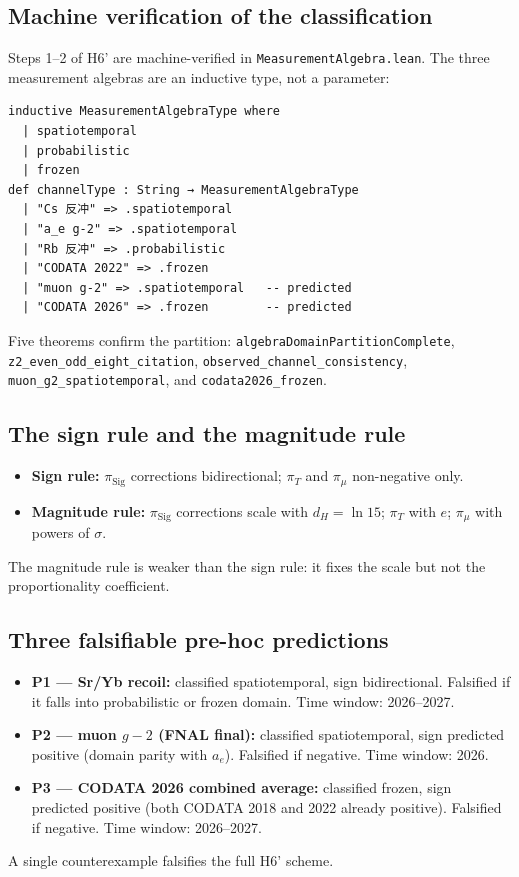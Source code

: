 \documentclass[11pt,twoside]{article}
\begin{document}
\subsection{Machine verification of the classification}
Steps 1--2 of H6' are machine-verified in \texttt{MeasurementAlgebra.lean}. The three measurement algebras are an inductive type, not a parameter:
\begin{lstlisting}[language=Lean]
inductive MeasurementAlgebraType where
  | spatiotemporal
  | probabilistic
  | frozen
def channelType : String → MeasurementAlgebraType
  | "Cs 反冲" => .spatiotemporal
  | "a_e g-2" => .spatiotemporal
  | "Rb 反冲" => .probabilistic
  | "CODATA 2022" => .frozen
  | "muon g-2" => .spatiotemporal   -- predicted
  | "CODATA 2026" => .frozen        -- predicted
\end{lstlisting}
Five theorems confirm the partition: \texttt{algebraDomainPartitionComplete}, \texttt{z2\_even\_odd\_eight\_citation}, \texttt{observed\_channel\_consistency}, \texttt{muon\_g2\_spatiotemporal}, and \texttt{codata2026\_frozen}.

\subsection{The sign rule and the magnitude rule}
\begin{itemize}
\item \textbf{Sign rule:} $\pi_{\mathrm{Sig}}$ corrections bidirectional; $\pi_T$ and $\pi_\mu$ non-negative only.
\item \textbf{Magnitude rule:} $\pi_{\mathrm{Sig}}$ corrections scale with $d_H = \ln 15$; $\pi_T$ with $e$; $\pi_\mu$ with powers of $\sigma$.
\end{itemize}
The magnitude rule is weaker than the sign rule: it fixes the scale but not the proportionality coefficient.

\subsection{Three falsifiable pre-hoc predictions}
\begin{itemize}
\item \textbf{P1 — Sr/Yb recoil:} classified spatiotemporal, sign bidirectional. Falsified if it falls into probabilistic or frozen domain. Time window: 2026--2027.
\item \textbf{P2 — muon $g-2$ (FNAL final):} classified spatiotemporal, sign predicted positive (domain parity with $a_e$). Falsified if negative. Time window: 2026.
\item \textbf{P3 — CODATA 2026 combined average:} classified frozen, sign predicted positive (both CODATA 2018 and 2022 already positive). Falsified if negative. Time window: 2026--2027.
\end{itemize}
A single counterexample falsifies the full H6' scheme.
\end{document}
